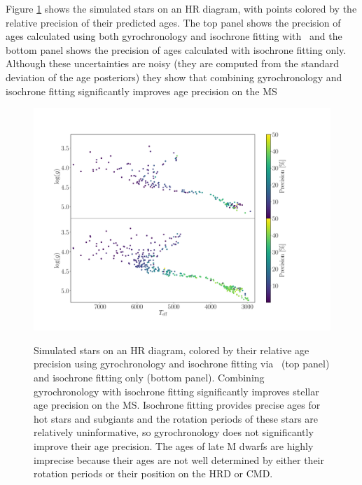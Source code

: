 Figure \ref{fig:precision} shows the simulated stars on an HR diagram, with
points colored by the relative precision of their predicted ages.
The top panel shows the precision of ages calculated using both gyrochronology
and isochrone fitting with \sd\ and the bottom panel shows the precision of
ages calculated with isochrone fitting only.
Although these uncertainties are noisy (they are computed from the standard
deviation of the age posteriors) they show that combining gyrochronology and
isochrone fitting significantly improves age precision on the MS
\begin{figure}
  \caption{
Simulated stars on an HR diagram, colored by their relative age precision
    using gyrochronology and isochrone fitting via \sd\ (top panel) and
    isochrone fitting only (bottom panel).
Combining gyrochronology with isochrone fitting significantly improves stellar
    age precision on the MS.
Isochrone fitting provides precise ages for hot stars and subgiants and the
    rotation periods of these stars are relatively uninformative, so
    gyrochronology does not significantly improve their age precision.
The ages of late M dwarfs are highly imprecise because their ages are not well
    determined by either their rotation periods or their position on the HRD
    or CMD.
}
  \centering
    \includegraphics[width=1\textwidth]{precision_plot}
\label{fig:precision}
\end{figure}

